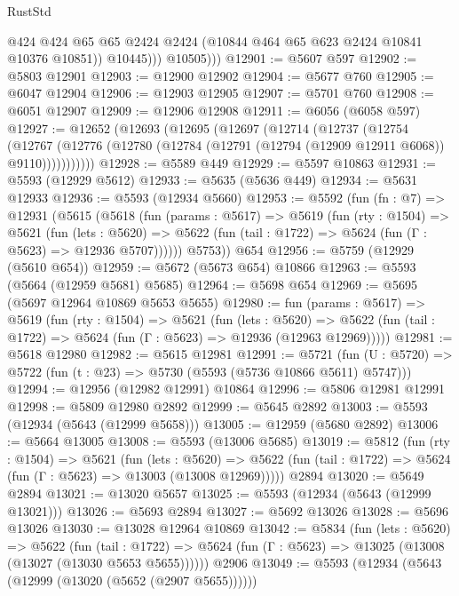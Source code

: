 \begin{lexlean}{RustStd}
\begin{coremodule}
                  @424
                  @424
                  @65
                  @65
                  @2424
                  @2424
                  (@10844 @464 @65 @623 @2424 @10841 @10376 @10851))
                @10445)))
          @10505)))
@12901 := @5607 @597
@12902 := @5803 @12901
@12903 := @12900 @12902
@12904 := @5677 @760
@12905 := @6047 @12904
@12906 := @12903 @12905
@12907 := @5701 @760
@12908 := @6051 @12907
@12909 := @12906 @12908
@12911 := @6056 (@6058 @597)
@12927 := @12652
    (@12693
      (@12695
        (@12697
          (@12714
            (@12737
              (@12754
                (@12767
                  (@12776 (@12780 (@12784 (@12791 (@12794 (@12909 @12911 @6068)) @9110)))))))))))
@12928 := @5589 @449
@12929 := @5597 @10863
@12931 := @5593 (@12929 @5612)
@12933 := @5635 (@5636 @449)
@12934 := @5631 @12933
@12936 := @5593 (@12934 @5660)
@12953 := @5592
    (fun (fn : @7) =>
    @12931
      (@5615
        (@5618
          (fun (params : @5617) =>
          @5619
            (fun (rty : @1504) =>
            @5621
              (fun (lets : @5620) =>
              @5622 (fun (tail : @1722) => @5624 (fun (Γ : @5623) => @12936 @5707))))))
        @5753))
    @654
@12956 := @5759 (@12929 (@5610 @654))
@12959 := @5672 (@5673 @654) @10866
@12963 := @5593 (@5664 (@12959 @5681) @5685)
@12964 := @5698 @654
@12969 := @5695 (@5697 @12964 @10869 @5653 @5655)
@12980 := fun (params : @5617) =>
  @5619
    (fun (rty : @1504) =>
    @5621
      (fun (lets : @5620) =>
      @5622 (fun (tail : @1722) => @5624 (fun (Γ : @5623) => @12936 (@12963 @12969)))))
@12981 := @5618 @12980
@12982 := @5615 @12981
@12991 := @5721
    (fun (U : @5720) => @5722 (fun (t : @23) => @5730 (@5593 (@5736 @10866 @5611) @5747)))
@12994 := @12956 (@12982 @12991) @10864
@12996 := @5806 @12981 @12991
@12998 := @5809 @12980 @2892
@12999 := @5645 @2892
@13003 := @5593 (@12934 (@5643 (@12999 @5658)))
@13005 := @12959 (@5680 @2892)
@13006 := @5664 @13005
@13008 := @5593 (@13006 @5685)
@13019 := @5812
    (fun (rty : @1504) =>
    @5621
      (fun (lets : @5620) =>
      @5622 (fun (tail : @1722) => @5624 (fun (Γ : @5623) => @13003 (@13008 @12969)))))
    @2894
@13020 := @5649 @2894
@13021 := @13020 @5657
@13025 := @5593 (@12934 (@5643 (@12999 @13021)))
@13026 := @5693 @2894
@13027 := @5692 @13026
@13028 := @5696 @13026
@13030 := @13028 @12964 @10869
@13042 := @5834
    (fun (lets : @5620) =>
    @5622
      (fun (tail : @1722) =>
      @5624 (fun (Γ : @5623) => @13025 (@13008 (@13027 (@13030 @5653 @5655))))))
    @2906
@13049 := @5593 (@12934 (@5643 (@12999 (@13020 (@5652 (@2907 @5655))))))

\end{coremodule}
\end{lexlean}
